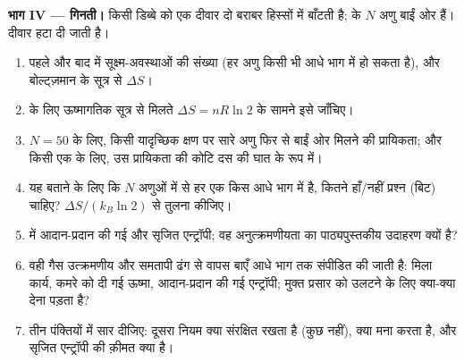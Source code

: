 \begin{problem}[{सप्ताहांत समस्या --- ठंडा होता एक प्याला, मिलाया गया एक
जल-कुंड, एक प्रशीतक और अणुओं का एक डिब्बा: चार एन्ट्रॉपी-संतुलन, और सृजित
एन्ट्रॉपी कार्य के रूप में कितनी क़ीमत की थी}]
\medskip
\noindent\textbf{भाग IV --- गिनती।}
किसी डिब्बे को एक दीवार दो बराबर हिस्सों में बाँटती है;  के $N$
अणु बाईं ओर हैं। दीवार हटा दी जाती है।
\begin{enumerate}[resume]
  \item पहले और बाद में सूक्ष्म-अवस्थाओं की संख्या (हर अणु किसी भी आधे भाग
        में हो सकता है), और बोल्ट्ज़मान के सूत्र से $\Delta S$।
  \item {} के लिए ऊष्मागतिक सूत्र से मिलते $\Delta S = nR\ln2$ के
        सामने इसे जाँचिए।
  \item $N = 50$ के लिए, किसी यादृच्छिक क्षण पर सारे अणु फिर से बाईं ओर
        मिलने की प्रायिकता; और किसी एक  के लिए, उस प्रायिकता की कोटि दस
        की घात के रूप में।
  \item यह बताने के लिए कि $N$ अणुओं में से हर एक किस आधे भाग में है, कितने
        हाँ/नहीं प्रश्न (बिट) चाहिए? $\Delta S/(k_B\ln2)$ से तुलना कीजिए।
  \item {} में आदान-प्रदान की गई और सृजित एन्ट्रॉपी; वह
        अनुत्क्रमणीयता का पाठ्यपुस्तकीय उदाहरण क्यों है?
  \item वही गैस उत्क्रमणीय और समतापी ढंग से वापस बाएँ आधे भाग तक संपीडित
        की जाती है: मिला कार्य, कमरे को दी गई ऊष्मा, आदान-प्रदान की गई
        एन्ट्रॉपी; मुक्त प्रसार को उलटने के लिए क्या-क्या देना पड़ता है?
  \item तीन पंक्तियों में सार दीजिए: दूसरा नियम क्या संरक्षित रखता है
        (कुछ नहीं), क्या मना करता है, और सृजित एन्ट्रॉपी की क़ीमत क्या है।
\end{enumerate}
\end{problem}
